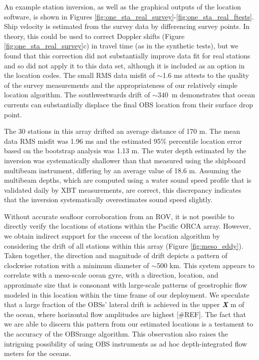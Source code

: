 An example station inversion, as well as the graphical outputs of the location software, is shown in Figures \ref{fig:one_sta_real_survey}-\ref{fig:one_sta_real_ftests}. Ship velocity is estimated from the survey data by differencing survey points. In theory, this could be used to correct Doppler shifts (Figure \ref{fig:one_sta_real_survey}c) in travel time (as in the synthetic tests), but we found that this correction did not substantially improve data fit for real stations and so did not apply it to this data set, although it is included as an option in the location codes. The small RMS data misfit of $\sim$1.6 ms attests to the quality of the survey measurements and the appropriateness of our relatively simple location algorithm. The southwestwards drift of \mbox{$\sim340$ m} demonstrates that ocean currents can substantially displace the final OBS location from their surface drop point. 

The 30 stations in this array drifted an average distance of 170 m. The mean data RMS misfit was 1.96 ms and the estimated 95\% percentile location error based on the bootstrap analysis was 1.13 m. The water depth estimated by the inversion was systematically shallower than that measured using the shipboard multibeam instrument, differing by an average value of 18.6 m. Assuming the multibeam depths, which are computed using a water sound speed profile that is validated daily by XBT measurements, are correct, this discrepancy indicates that the inversion systematically overestimates sound speed slightly. 

Without accurate seafloor corroboration from an ROV, it is not possible to directly verify the locations of stations within the Pacific ORCA array. However, we  obtain indirect support for the success of the location algorithm by considering the drift of all stations within this array (Figure \ref{fig:meso_eddy}). Taken together, the direction and magnitude of drift depicts a pattern of clockwise rotation with a minimum diameter of $\sim$500 km. This system appears to correlate with a meso-scale ocean gyre, with a direction, location, and approximate size that is consonant with large-scale patterns of geostrophic flow modeled in this location within the time frame of our deployment. We speculate that a large fraction of the OBSs' lateral drift is achieved in the upper \textit{\textbf{X}} m of the ocean, where horizontal flow amplitudes are highest [\#REF]. The fact that we are able to discern this pattern from our estimated locations is a testament to the accuracy of the OBSrange algorithm. This observation also raises the intriguing possibility of using OBS instruments as ad hoc depth-integrated flow meters for the oceans. 

